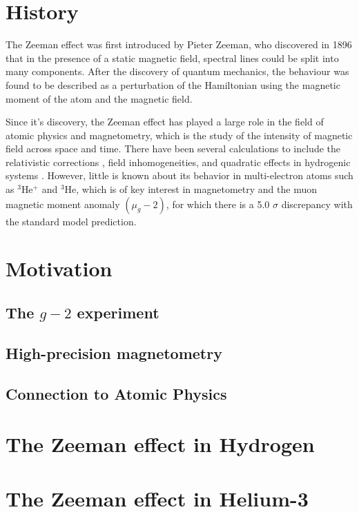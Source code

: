     \section{History}\label{sec:history}
        The Zeeman effect was first introduced by Pieter Zeeman, who discovered in 1896 that in the presence of a static magnetic field, spectral lines could be split into many components. After the discovery of quantum mechanics, the behaviour was found to be described as a perturbation of the Hamiltonian using the magnetic moment of the atom and the magnetic field.     
    
        Since it's discovery, the Zeeman effect has played a large role in the field of atomic physics and magnetometry, which is the study of the intensity of magnetic field across space and time. There have been several calculations to include the relativistic corrections \cite{2007Drake-Wu, Drake-Yan}, field inhomogeneities, and quadratic effects in hydrogenic systems \cite{Fontanari_Sadovskií_2015}. However, little is known about its behavior in multi-electron atoms such as $^3$He$^+$ and $^3$He, which is of key interest in magnetometry and the muon magnetic moment anomaly $(\mu_g - 2)$, for which there is a 5.0 $\sigma$ discrepancy \cite{aguillard2023measurement} with the standard model prediction.

    \section{Motivation}\label{sec:motivation}
        \subsection{The $g-2$ experiment}\label{sec:g-2}
        \subsection{High-precision magnetometry}\label{sec:High-Precision-magnetometry}
        \subsection{Connection to Atomic Physics}\label{sec:Connection_To_AMO}
    \section{The Zeeman effect in Hydrogen}\label{sec:Ordinary_Zeeman}
    \section{The Zeeman effect in Helium-3}\label{sec:Ordinary_Zeeman_He3}
